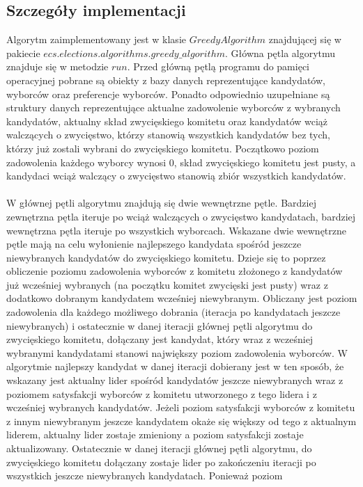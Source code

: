 \documentclass[pdflatex,11pt]{../aghdoc_version2}
\begin{document}
\subsection{Szczegóły implementacji}
Algorytm zaimplementowany jest w klasie $GreedyAlgorithm$ znajdującej się w pakiecie
$ecs.elections.algorithms.greedy\_algorithm$. Główna pętla algorytmu znajduje się w metodzie
$run$. Przed główną pętlą programu do pamięci operacyjnej pobrane są obiekty z bazy danych
reprezentujące kandydatów, wyborców oraz preferencje wyborców. Ponadto odpowiednio
uzupełniane są struktury danych reprezentujące aktualne zadowolenie wyborców z wybranych kandydatów, aktualny skład zwycięskiego komitetu oraz kandydatów wciąż
walczących o zwycięstwo, którzy stanowią wszystkich kandydatów bez tych, którzy już
zostali wybrani do zwycięskiego komitetu. Początkowo poziom zadowolenia każdego
wyborcy wynosi $0$, skład zwycięskiego komitetu jest pusty, a kandydaci wciąż walczący o
zwycięstwo stanowią zbiór wszystkich kandydatów. \\ \\
W głównej pętli algorytmu znajdują się dwie wewnętrzne pętle. Bardziej zewnętrzna pętla
iteruje po wciąż walczących o zwycięstwo kandydatach, bardziej wewnętrzna pętla iteruje po
wszystkich wyborcach. Wskazane dwie wewnętrzne pętle mają na celu wyłonienie
najlepszego kandydata spośród jeszcze niewybranych kandydatów do zwycięskiego
komitetu. Dzieje się to poprzez obliczenie poziomu zadowolenia wyborców z komitetu
złożonego z kandydatów już wcześniej wybranych (na początku komitet zwycięski jest pusty)
wraz z dodatkowo dobranym kandydatem wcześniej niewybranym. Obliczany jest poziom
zadowolenia dla każdego możliwego dobrania (iteracja po kandydatach jeszcze
niewybranych) i ostatecznie w danej iteracji głównej pętli algorytmu do zwycięskiego
komitetu, dołączany jest kandydat, który wraz z wcześniej wybranymi kandydatami stanowi
największy poziom zadowolenia wyborców. W algorytmie najlepszy kandydat w danej iteracji
dobierany jest w ten sposób, że wskazany jest aktualny lider spośród kandydatów jeszcze
niewybranych wraz z poziomem satysfakcji wyborców z komitetu utworzonego z tego lidera i
z wcześniej wybranych kandydatów. Jeżeli poziom satysfakcji wyborców z komitetu z innym
niewybranym jeszcze kandydatem okaże się większy od tego z aktualnym liderem, aktualny
lider zostaje zmieniony a poziom satysfakcji zostaje aktualizowany. Ostatecznie w danej
iteracji głównej pętli algorytmu, do zwycięskiego komitetu dołączany zostaje lider po
zakończeniu iteracji po wszystkich jeszcze niewybranych kandydatach. Ponieważ poziom
\end{document}
